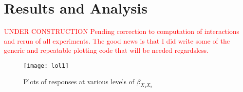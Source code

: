 \documentclass[../paper.tex]{subfiles}
\begin{document}
\section{Results and Analysis}
\textcolor{red}{UNDER CONSTRUCTION Pending correction to computation of interactions and rerun of all experiments. The good news is that I did write some of the generic and repeatable plotting code that will be needed regardsless. }

\begin{figure}[H]

\centering
\texttt{[image: lol1]}
\caption{Plots of responses at various levels of $\beta_{X_{1}X_{2}}$}
\label{fig:lol1}
\end{figure}
\end{document}
